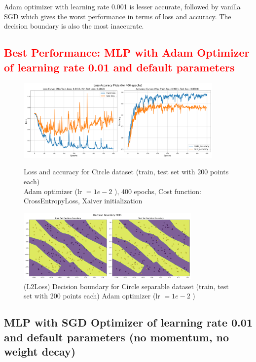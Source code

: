 \begin{solve}
Adam optimizer with learning rate 0.001 is lesser accurate, followed by vanilla SGD which gives the worst performance in terms of loss and accuracy. The decision boundary is also the most inaccurate.

\subsection{ \textcolor{red}{Best Performance: MLP with Adam Optimizer of learning rate 0.01 and default parameters} }

\begin{figure}[H]
    \centering
    \includegraphics[width=0.9\textwidth]{plots/sinusoid_adam-lr1e-2_more_paramsloss_acc.png}
    \caption{Loss and accuracy for Circle dataset (train, test set with 200 points each)\\ Adam optimizer (lr $=1e-2$ ), 400 epochs, Cost function: CrossEntropyLoss, Xaiver initialization}
    \includegraphics[width=0.8\textwidth]{plots/sinusoid_adam-lr1e-2_more_paramsboundary.png}
    \caption{(L2Loss) Decision boundary for Circle separable dataset (train, test set with 200 points each) 
    Adam optimizer (lr $=1e-2$ )}
\end{figure}

\subsection{MLP with SGD Optimizer of learning rate 0.01 and default parameters (no momentum, no weight decay)}


\end{solve}
